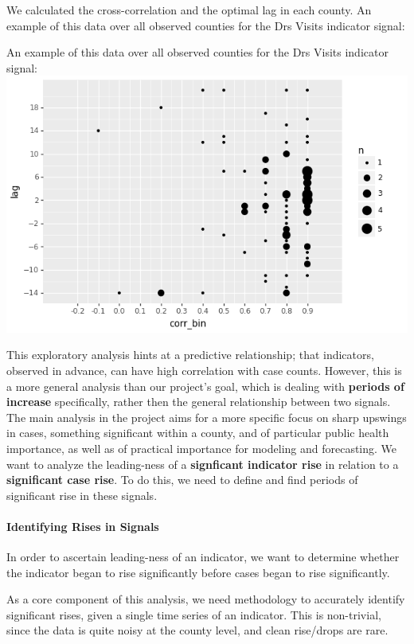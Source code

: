 \documentclass[]{article}
\let\oldparagraph\paragraph
\renewcommand{\paragraph}[1]{\oldparagraph{#1}\mbox{}}
\begin{document}
We calculated the cross-correlation and the optimal lag in each county.
An example of this data over all observed counties for the Drs Visits
indicator signal:

An example of this data over all observed counties for the Drs Visits
indicator signal: \includegraphics{cross_correlation_plot.png}

This exploratory analysis hints at a predictive relationship; that
indicators, observed in advance, can have high correlation with case
counts. However, this is a more general analysis than our project's
goal, which is dealing with \textbf{periods of increase} specifically,
rather then the general relationship between two signals. The main
analysis in the project aims for a more specific focus on sharp upswings
in cases, something significant within a county, and of particular
public health importance, as well as of practical importance for
modeling and forecasting. We want to analyze the leading-ness of a
\textbf{signficant indicator rise} in relation to a \textbf{significant
case rise}. To do this, we need to define and find periods of
significant rise in these signals.

\hypertarget{identifying-rises-in-signals}{%
\paragraph{Identifying Rises in
Signals}\label{identifying-rises-in-signals}}

In order to ascertain leading-ness of an indicator, we want to determine
whether the indicator began to rise significantly before cases began to
rise significantly.

As a core component of this analysis, we need methodology to accurately
identify significant rises, given a single time series of an indicator.
This is non-trivial, since the data is quite noisy at the county level,
and clean rise/drops are rare.
\end{document}
